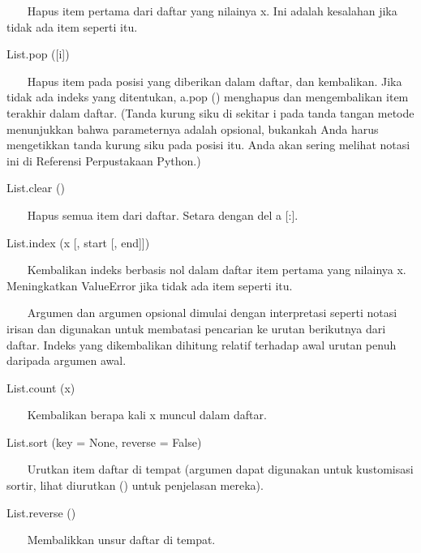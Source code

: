 ~~~ Hapus item pertama dari daftar yang nilainya x. Ini adalah kesalahan jika tidak ada item seperti itu. \par
\vspace{12pt}
List.pop ([i]) \par
\vspace{12pt}
~~~ Hapus item pada posisi yang diberikan dalam daftar, dan kembalikan. Jika tidak ada indeks yang ditentukan, a.pop () menghapus dan mengembalikan item terakhir dalam daftar. (Tanda kurung siku di sekitar i pada tanda tangan metode menunjukkan bahwa parameternya adalah opsional, bukankah Anda harus mengetikkan tanda kurung siku pada posisi itu. Anda akan sering melihat notasi ini di Referensi Perpustakaan Python.) \par
\vspace{12pt}
List.clear () \par
\vspace{12pt}
~~~ Hapus semua item dari daftar. Setara dengan del a [:]. \par
\vspace{12pt}
List.index (x [, start [, end]]) \par
\vspace{12pt}
~~~ Kembalikan indeks berbasis nol dalam daftar item pertama yang nilainya x. Meningkatkan ValueError jika tidak ada item seperti itu. \par
\vspace{12pt}
~~~ Argumen dan argumen opsional dimulai dengan interpretasi seperti notasi irisan dan digunakan untuk membatasi pencarian ke urutan berikutnya dari daftar. Indeks yang dikembalikan dihitung relatif terhadap awal urutan penuh daripada argumen awal. \par
\vspace{12pt}
List.count (x) \par
\vspace{12pt}
~~~ Kembalikan berapa kali x muncul dalam daftar. \par
\vspace{12pt}
List.sort (key = None, reverse = False) \par
\vspace{12pt}
~~~ Urutkan item daftar di tempat (argumen dapat digunakan untuk kustomisasi sortir, lihat diurutkan () untuk penjelasan mereka). \par
\vspace{12pt}
List.reverse () \par
\vspace{12pt}
~~~ Membalikkan unsur daftar di tempat. \par
